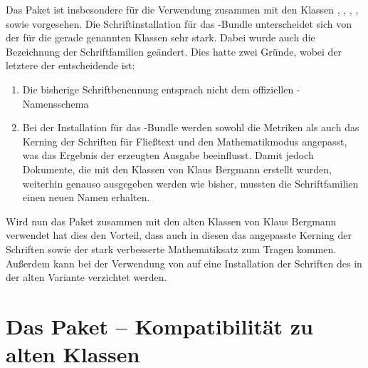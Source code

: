 Das Paket  ist insbesondere für die Verwendung zusammen 
mit den Klassen , , , 
,  sowie  vorgesehen. Die 
Schriftinstallation für das \TUDScript-Bundle unterscheidet sich von der für 
die gerade genannten Klassen sehr stark. Dabei wurde auch die Bezeichnung der 
Schriftfamilien geändert. Dies hatte zwei Gründe, wobei der letztere der 
entscheidende ist:
%
\begin{enumerate}
\item
  Die bisherige Schriftbenennung entsprach nicht dem offiziellen     
  {-Namensschema}
\item
  Bei der Installation für das \TUDScript-Bundle werden sowohl die Metriken
  als auch das Kerning der Schriften für Fließtext und den Mathematikmodus 
  angepasst, was das Ergebnis der erzeugten Ausgabe beeinflusst. Damit jedoch
  Dokumente, die mit den Klassen von Klaus Bergmann erstellt wurden, weiterhin 
  genauso ausgegeben werden wie bisher, mussten die Schriftfamilien einen neuen 
  Namen erhalten.
\end{enumerate}
%
Wird nun das Paket  zusammen mit den alten Klassen von 
Klaus Bergmann verwendet hat dies den Vorteil, dass auch in diesen das 
angepasste Kerning der Schriften sowie der stark verbesserte Mathematiksatz zum 
Tragen kommen. Außerdem kann bei der Verwendung von  auf 
eine Installation der Schriften des \CDs in der alten Variante verzichtet 
werden.



\section{Das Paket  -- Kompatibilität zu alten Klassen}
%
%
%
%
\noindent{}

